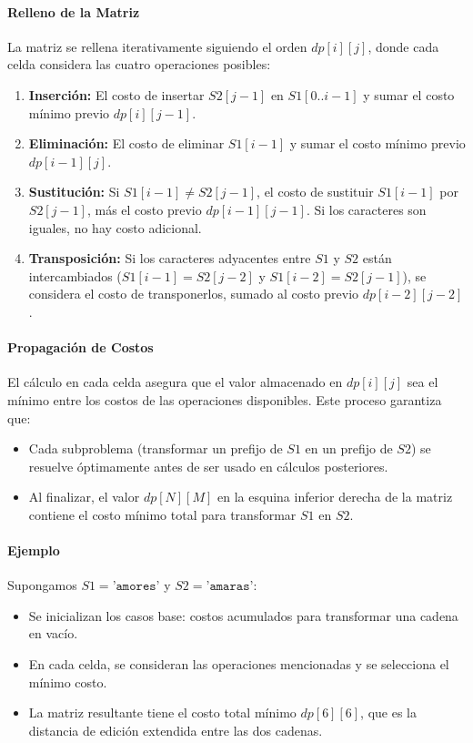 \paragraph{Relleno de la Matriz}
La matriz se rellena iterativamente siguiendo el orden \( dp[i][j] \), donde cada celda considera las cuatro operaciones posibles:
\begin{enumerate}
    \item \textbf{Inserción:} El costo de insertar \( S2[j-1] \) en \( S1[0..i-1] \) y sumar el costo mínimo previo \( dp[i][j-1] \).
    \item \textbf{Eliminación:} El costo de eliminar \( S1[i-1] \) y sumar el costo mínimo previo \( dp[i-1][j] \).
    \item \textbf{Sustitución:} Si \( S1[i-1] \neq S2[j-1] \), el costo de sustituir \( S1[i-1] \) por \( S2[j-1] \), más el costo previo \( dp[i-1][j-1] \). Si los caracteres son iguales, no hay costo adicional.
    \item \textbf{Transposición:} Si los caracteres adyacentes entre \( S1 \) y \( S2 \) están intercambiados (\( S1[i-1] = S2[j-2] \) y \( S1[i-2] = S2[j-1] \)), se considera el costo de transponerlos, sumado al costo previo \( dp[i-2][j-2] \).
\end{enumerate}

\paragraph{Propagación de Costos}
El cálculo en cada celda asegura que el valor almacenado en \( dp[i][j] \) sea el mínimo entre los costos de las operaciones disponibles. Este proceso garantiza que:
\begin{itemize}
    \item Cada subproblema (transformar un prefijo de \( S1 \) en un prefijo de \( S2 \)) se resuelve óptimamente antes de ser usado en cálculos posteriores.
    \item Al finalizar, el valor \( dp[N][M] \) en la esquina inferior derecha de la matriz contiene el costo mínimo total para transformar \( S1 \) en \( S2 \).
\end{itemize}

\paragraph{Ejemplo}
Supongamos \( S1 = \texttt{'amores'} \) y \( S2 = \texttt{'amaras'} \):
\begin{itemize}
    \item Se inicializan los casos base: costos acumulados para transformar una cadena en vacío.
    \item En cada celda, se consideran las operaciones mencionadas y se selecciona el mínimo costo.
    \item La matriz resultante tiene el costo total mínimo \( dp[6][6] \), que es la distancia de edición extendida entre las dos cadenas.
\end{itemize}

